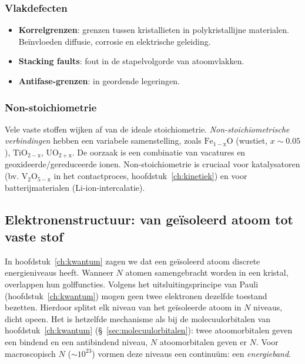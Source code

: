 \subsubsection{Vlakdefecten}

\begin{itemize}
\item \textbf{Korrelgrenzen}: grenzen tussen kristallieten in polykristallijne materialen. Be\"invloeden diffusie, corrosie en elektrische geleiding.
\item \textbf{Stacking faults}: fout in de stapelvolgorde van atoomvlakken.
\item \textbf{Antifase-grenzen}: in geordende legeringen.
\end{itemize}

\subsubsection{Non-stoichiometrie}
\label{sec:non-stoichiometrie}

Vele vaste stoffen wijken af van de ideale stoichiometrie. \emph{Non-stoichiometrische verbindingen} hebben een variabele samenstelling, zoals $\mathrm{Fe_{1-x}O}$ (wustiet, $x \sim 0.05$), $\mathrm{TiO_{2-x}}$, $\mathrm{UO_{2+x}}$. De oorzaak is een combinatie van vacatures en geoxideerde/gereduceerde ionen. Non-stoichiometrie is cruciaal voor katalysatoren (bv. $\mathrm{V_2O_{5-x}}$ in het contactproces, hoofdstuk~\ref{ch:kinetiek}) en voor batterijmaterialen (Li-ion-intercalatie).

\subsection{Elektronenstructuur: van ge\"isoleerd atoom tot vaste stof}

In hoofdstuk~\ref{ch:kwantum} zagen we dat een ge\"isoleerd atoom discrete energieniveaus heeft. Wanneer $N$ atomen samengebracht worden in een kristal, overlappen hun golffuncties. Volgens het uitsluitingsprincipe van Pauli (hoofdstuk~\ref{ch:kwantum}) mogen geen twee elektronen dezelfde toestand bezetten. Hierdoor splitst elk niveau van het ge\"isoleerde atoom in $N$ niveaus, dicht opeen. Het is hetzelfde mechanisme als bij de molecuulorbitalen van hoofdstuk~\ref{ch:kwantum} (\S~\ref{sec:molecuulorbitalen}): twee atoomorbitalen geven een bindend en een antibindend niveau, $N$ atoomorbitalen geven er $N$. Voor macroscopisch $N$ ($\sim10^{23}$) vormen deze niveaus een continu\"um: een \emph{energieband}.

